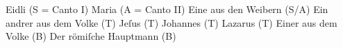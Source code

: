 \documentclass{ees}
\begin{document}
\eesTitlePage


Eidli (S = Canto I)
Maria (A = Canto II)
Eine aus den Weibern (S/A)
Ein andrer aus dem Volke (T)
Jeſus (T)
Johannes (T)
Lazarus (T)
Einer aus dem Volke (B)
Der römiſche Hauptmann (B)
\end{document}
